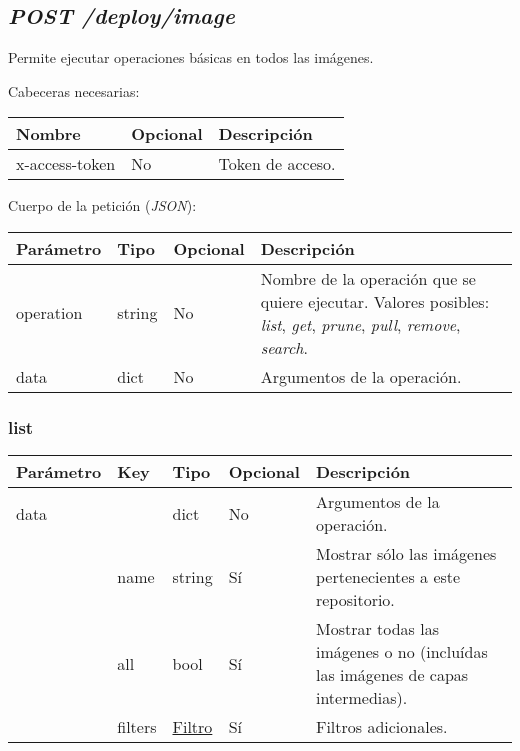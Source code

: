	
	
	
	
	\subsection{\textit{POST /deploy/image}}
		Permite ejecutar operaciones básicas en todos las imágenes.
	
		Cabeceras necesarias:
		\begin{table}[h!]
			\centering
	\begin{adjustbox}{max width=\textwidth}
			\begin{tabular}{|l|l|l|}
				\hline
				Nombre & Opcional & Descripción \\ \hline
				x-access-token & No & Token de acceso. \\ \hline
			\end{tabular}
\end{adjustbox}
		\end{table}
		
		Cuerpo de la petición (\textit{JSON}):
		
		\begin{table}[h!]
			\centering
	\begin{adjustbox}{max width=\textwidth}
			\begin{tabularx}{\linewidth}{|l|l|l|L|}
				\hline
				Parámetro & Tipo & Opcional & Descripción \\ \hline
				operation & string & No & Nombre de la operación que se quiere ejecutar. Valores posibles: \textit{list}, \textit{get}, \textit{prune}, \textit{pull}, \textit{remove}, \textit{search}. \\ \hline
				data & dict & No & Argumentos de la operación. \\ \hline
			\end{tabularx}
\end{adjustbox}
		\end{table}
	
		
			\subsubsection{list}
				\begin{table}[h!]
					\centering
	\begin{adjustbox}{max width=\textwidth}
					\begin{tabularx}{\linewidth}{|l|l|l|l|L|}
						\hline
						Parámetro & Key & Tipo & Opcional & Descripción \\ \hline
						data &  & dict & No & Argumentos de la operación. \\ \hline
						& name & string & Sí & Mostrar sólo las imágenes pertenecientes a este repositorio. \\ \hline
						& all & bool & Sí & Mostrar todas las imágenes o no (incluídas las imágenes de capas intermedias). \\ \hline
						& filters & \hyperref[sec:filtroimagen]{Filtro} & Sí & Filtros adicionales. \\ \hline
					\end{tabularx}
\end{adjustbox}
				\end{table}
			
